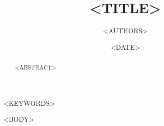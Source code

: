 \documentclass[conference]{IEEEtran}
\title{<TITLE>}
\date{<DATE>}  %
\author{
<AUTHORS>
}
\begin{document}
\maketitle
\thispagestyle{plain}
\pagestyle{plain}


\begin{abstract}
<ABSTRACT>
\end{abstract}


\begin{IEEEkeywords}
<KEYWORDS>
\end{IEEEkeywords}


<BODY>

\end{document}
